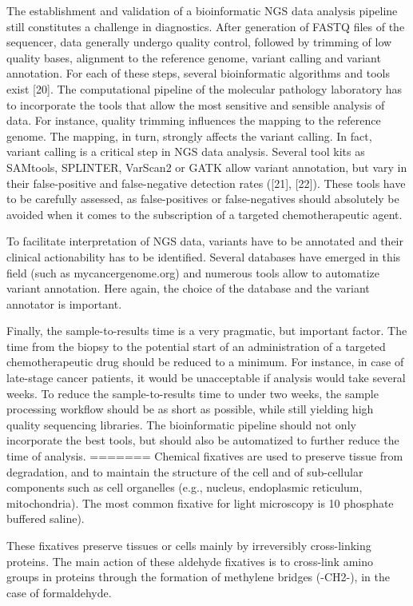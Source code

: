 The establishment and validation of a bioinformatic NGS data analysis pipeline still constitutes a challenge in diagnostics. After generation of FASTQ files of the sequencer, data generally undergo quality control, followed by trimming of low quality bases, alignment to the reference genome, variant calling and variant annotation. For each of these steps, several bioinformatic algorithms and tools exist [20]. The computational pipeline of the molecular pathology laboratory has to incorporate the tools that allow the most sensitive and sensible analysis of data. For instance, quality trimming influences the mapping to the reference genome. The mapping, in turn, strongly affects the variant calling. In fact, variant calling is a critical step in NGS data analysis. Several tool kits as SAMtools, SPLINTER, VarScan2 or GATK allow variant annotation, but vary in their false-positive and false-negative detection rates ([21], [22]). These tools have to be carefully assessed, as false-positives or false-negatives should absolutely be avoided when it comes to the subscription of a targeted chemotherapeutic agent.

To facilitate interpretation of NGS data, variants have to be annotated and their clinical actionability has to be identified. Several databases have emerged in this field (such as mycancergenome.org) and numerous tools allow to automatize variant annotation. Here again, the choice of the database and the variant annotator is important.

Finally, the sample-to-results time is a very pragmatic, but important factor. The time from the biopsy to the potential start of an administration of a targeted chemotherapeutic drug should be reduced to a minimum. For instance, in case of late-stage cancer patients, it would be unacceptable if analysis would take several weeks. To reduce the sample-to-results time to under two weeks, the sample processing workflow should be as short as possible, while still yielding high quality sequencing libraries. The bioinformatic pipeline should not only incorporate the best tools, but should also be automatized to further reduce the time of analysis.
=======
Chemical fixatives are used to preserve tissue from degradation, and to maintain
the structure of the cell and of sub-cellular components such as cell organelles
(e.g., nucleus, endoplasmic reticulum, mitochondria). The most common fixative
for light microscopy is 10%
phosphate buffered saline).

These fixatives preserve tissues or cells mainly by irreversibly cross-linking
proteins. The main action of these aldehyde fixatives is to cross-link amino
groups in proteins through the formation of methylene bridges (-CH2-), in the
case of formaldehyde.

